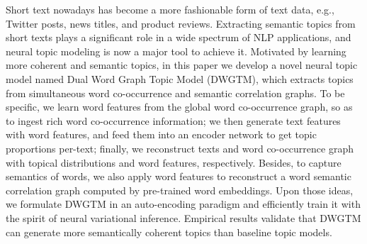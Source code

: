 Short text nowadays has become a more fashionable form of text data, e.g., Twitter posts, news titles, and product reviews. Extracting semantic topics from short texts plays a significant role in a wide spectrum of NLP applications, and neural topic modeling is now a major tool to achieve it. Motivated by learning more coherent and semantic topics, in this paper we develop a novel neural topic model named Dual Word Graph Topic Model (DWGTM), which extracts topics from simultaneous word co-occurrence and semantic correlation graphs. To be specific, we learn word features from the global word co-occurrence graph, so as to ingest rich word co-occurrence information; we then generate text features with word features, and feed them into an encoder network to get topic proportions per-text; finally, we reconstruct texts and word co-occurrence graph with topical distributions and word features, respectively. Besides, to capture semantics of words, we also apply word features to reconstruct a word semantic correlation graph computed by pre-trained word embeddings. Upon those ideas, we formulate DWGTM in an auto-encoding paradigm and efficiently train it with the spirit of neural variational inference. Empirical results validate that DWGTM can generate more semantically coherent topics than baseline topic models.
